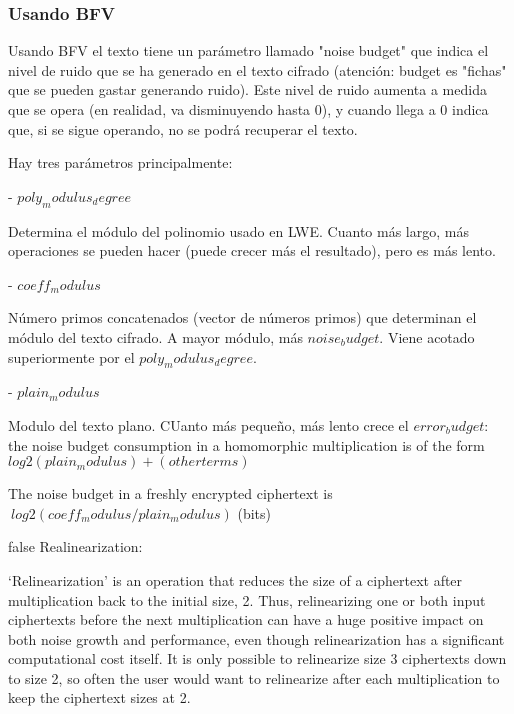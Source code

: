 \subsubsection{Usando BFV}

Usando BFV el texto tiene un parámetro llamado "noise budget" que indica el nivel de ruido que se ha generado en el texto cifrado (atención: budget es "fichas" que se pueden gastar generando ruido). Este nivel de ruido aumenta a medida que se opera (en realidad, va disminuyendo hasta 0), y cuando llega a 0 indica que, si se sigue operando, no se podrá recuperar el texto.


Hay tres parámetros principalmente:

- $poly_modulus_degree$

Determina el módulo del polinomio usado en LWE. Cuanto más largo, más operaciones se pueden hacer (puede crecer más el resultado), pero es más lento.

- $coeff_modulus$

Número primos concatenados (vector de números primos) que determinan el módulo del texto cifrado. A mayor módulo, más $noise_budget$. Viene acotado superiormente por el $poly_modulus_degree$.

- $plain_modulus$

Modulo del texto plano. CUanto más pequeño, más lento crece el $error_budget$: the noise budget consumption in a homomorphic multiplication is of the form $log2(plain_modulus) + (other terms)$

The noise budget in a freshly encrypted ciphertext is $~ log2(coeff_modulus/plain_modulus)$  (bits)


\if false
Realinearization:

`Relinearization' is an operation that reduces the size of a ciphertext after
    multiplication back to the initial size, 2. Thus, relinearizing one or both
    input ciphertexts before the next multiplication can have a huge positive
    impact on both noise growth and performance, even though relinearization has
    a significant computational cost itself. It is only possible to relinearize
    size 3 ciphertexts down to size 2, so often the user would want to relinearize
    after each multiplication to keep the ciphertext sizes at 2.
    
